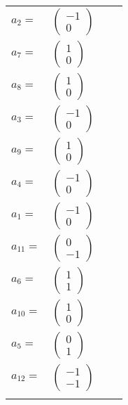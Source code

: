 \documentclass[1p]{elsarticle_modified}
\theoremstyle{definition}
\begin{document}
\begin{tabular}{m{7pt} m{180pt} m{7pt} m{180pt} }
\flushright $a_{2}=$&$\begin{pmatrix}-1\\0\end{pmatrix}$ \\
\flushright $a_{7}=$&$\begin{pmatrix}1\\0\end{pmatrix}$ \\
\flushright $a_{8}=$&$\begin{pmatrix}1\\0\end{pmatrix}$ \\
\flushright $a_{3}=$&$\begin{pmatrix}-1\\0\end{pmatrix}$ \\
\flushright $a_{9}=$&$\begin{pmatrix}1\\0\end{pmatrix}$ \\
\flushright $a_{4}=$&$\begin{pmatrix}-1\\0\end{pmatrix}$ \\
\flushright $a_{1}=$&$\begin{pmatrix}-1\\0\end{pmatrix}$ \\
\flushright $a_{11}=$&$\begin{pmatrix}0\\-1\end{pmatrix}$ \\
\flushright $a_{6}=$&$\begin{pmatrix}1\\1\end{pmatrix}$ \\
\flushright $a_{10}=$&$\begin{pmatrix}1\\0\end{pmatrix}$ \\
\flushright $a_{5}=$&$\begin{pmatrix}0\\1\end{pmatrix}$ \\
\flushright $a_{12}=$&$\begin{pmatrix}-1\\-1\end{pmatrix}$\\&\end{tabular}
\end{document}

